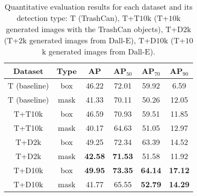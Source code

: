 \begin{table}[b!]
    \caption{Quantitative evaluation results for each dataset and its detection type: T (TrashCan), T+T$10$k (T+$10$k generated images with the TrashCan objects), T+D$2$k (T+$2$k generated images from Dall-E), T+D$10$k (T+$10$k generated images from Dall-E).}
    \centering
    \begin{tabular}{cccccc}
    \toprule
         Dataset & Type & AP & AP$_{50}$ & AP$_{70}$ & AP$_{90}$  \\ \midrule
         T (baseline)&box & 46.22 & 72.01 & 59.92 &	6.59 \\ 
         T (baseline)&mask & 41.33 & 70.11 & 50.26 & 12.05 \\ 
         T+T10k &box& 46.59 &70.93&59.51 & 11.85 \\ 
         T+T10k &mask& 40.17& 64.63 &51.05 & 12.97 \\ 
         T+D2k& box & 49.25 & 72.34 & 63.39 & 14.52  \\ 
         T+D2k& mask & \textbf{42.58} & \textbf{71.53} & 51.58 & 11.92  \\ 
         T+D10k& box & \textbf{49.95} & \textbf{73.35} & \textbf{64.14} & \textbf{17.12}  \\ 
         T+D10k& mask & 41.77 & 65.55 & \textbf{52.79} & \textbf{14.29}  \\  \bottomrule

    \end{tabular}
    \label{tab:map_results}
\end{table}